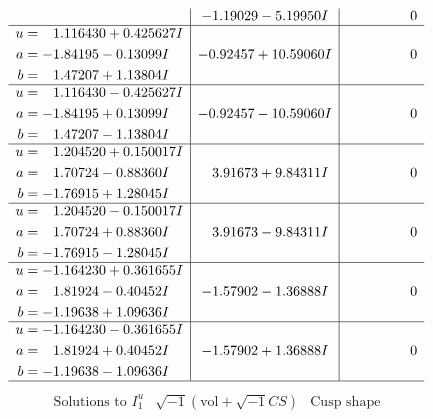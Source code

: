 \documentclass[1p]{elsarticle_modified}
\theoremstyle{definition}
\newcommand{\I}{\sqrt{-1}}
\begin{document}
$$\begin{array}{c|c|c}
 & -1.19029 - 5.19950 I & \phantom{-0.000000 } 0 \\ \hline\begin{aligned}
u &= \phantom{-}1.116430 + 0.425627 I \\
a &= -1.84195 - 0.13099 I \\
b &= \phantom{-}1.47207 + 1.13804 I\end{aligned}
 & -0.92457 + 10.59060 I & \phantom{-0.000000 } 0 \\ \hline\begin{aligned}
u &= \phantom{-}1.116430 - 0.425627 I \\
a &= -1.84195 + 0.13099 I \\
b &= \phantom{-}1.47207 - 1.13804 I\end{aligned}
 & -0.92457 - 10.59060 I & \phantom{-0.000000 } 0 \\ \hline\begin{aligned}
u &= \phantom{-}1.204520 + 0.150017 I \\
a &= \phantom{-}1.70724 - 0.88360 I \\
b &= -1.76915 + 1.28045 I\end{aligned}
 & \phantom{-}3.91673 + 9.84311 I & \phantom{-0.000000 } 0 \\ \hline\begin{aligned}
u &= \phantom{-}1.204520 - 0.150017 I \\
a &= \phantom{-}1.70724 + 0.88360 I \\
b &= -1.76915 - 1.28045 I\end{aligned}
 & \phantom{-}3.91673 - 9.84311 I & \phantom{-0.000000 } 0 \\ \hline\begin{aligned}
u &= -1.164230 + 0.361655 I \\
a &= \phantom{-}1.81924 - 0.40452 I \\
b &= -1.19638 + 1.09636 I\end{aligned}
 & -1.57902 - 1.36888 I & \phantom{-0.000000 } 0 \\ \hline\begin{aligned}
u &= -1.164230 - 0.361655 I \\
a &= \phantom{-}1.81924 + 0.40452 I \\
b &= -1.19638 - 1.09636 I\end{aligned}
 & -1.57902 + 1.36888 I & \phantom{-0.000000 } 0\\
 \hline 
 \end{array}$$\newpage$$\begin{array}{c|c|c}  
\text{Solutions to }I^u_{1}& \I (\text{vol} + \sqrt{-1}CS) & \text{Cusp shape}\\

\end{array}$$
\end{document}
